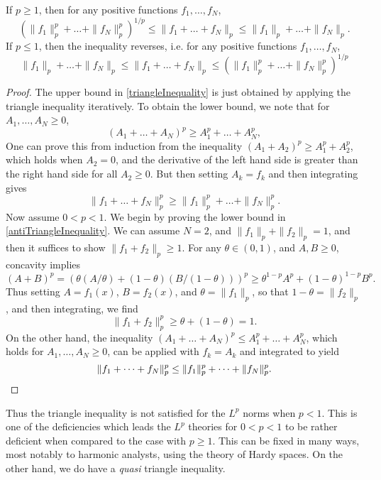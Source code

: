 \begin{theorem}
    If $p \geq 1$, then for any positive functions $f_1, \dots, f_N$,
    \begin{equation} \label{triangleInequality} ( \| f_1 \|_p^p + \dots + \| f_N \|_p^p )^{1/p} \leq \| f_1 + \dots + f_N \|_p \leq \| f_1 \|_p + \dots + \| f_N \|_p. \end{equation}
    If $p \leq 1$, then the inequality reverses, i.e. for any positive functions $f_1, \dots, f_N$,
    \begin{equation} \label{antiTriangleInequality} \| f_1 \|_p + \dots + \| f_N \|_p \leq \| f_1 + \dots + f_N \|_p \leq (\| f_1 \|_p^p + \dots + \| f_N \|_p^p)^{1/p} \end{equation}
\end{theorem}
\begin{proof}
    The upper bound in \ref{triangleInequality} is just obtained by applying the triangle inequality iteratively. To obtain the lower bound, we note that for $A_1, \dots, A_N \geq 0$,
    \[ (A_1 + \dots + A_N)^p \geq A_1^p + \dots + A_N^p, \]
    One can prove this from induction from the inequality $(A_1 + A_2)^p \geq A_1^p + A_2^p$, which holds when $A_2 = 0$, and the derivative of the left hand side is greater than the right hand side for all $A_2 \geq 0$. But then setting $A_k = f_k$ and then integrating gives
    \[ \| f_1 + \dots + f_N \|_p^p \geq \| f_1 \|_p^p + \dots + \| f_N \|_p^p. \]
    Now assume $0 < p < 1$. We begin by proving the lower bound in \ref{antiTriangleInequality}. We can assume $N = 2$, and $\| f_1 \|_p + \| f_2 \|_p = 1$, and then it suffices to show $\| f_1 + f_2 \|_p \geq 1$. For any $\theta \in (0,1)$, and $A,B \geq 0$, concavity implies
    \[ (A + B)^p = (\theta (A/\theta) + (1 - \theta) (B/(1-\theta)))^p \geq \theta^{1-p} A^p + (1 - \theta)^{1-p} B^p. \]
    Thus setting $A = f_1(x)$, $B = f_2(x)$, and $\theta = \| f_1 \|_p$, so that $1 - \theta = \| f_2 \|_p$, and then integrating, we find
    \[ \| f_1 + f_2 \|_p^p \geq \theta + (1 - \theta) = 1. \]
    On the other hand, the inequality $(A_1 + \dots + A_N)^p \leq A_1^p + \dots + A_N^p$, which holds for $A_1, \dots, A_N \geq 0$, can be applied with $f_k = A_k$ and integrated to yield
    \[ \| f_1 + \dots + f_N \|_p^p \leq \| f_1 \|_p^p + \dots + \| f_N \|_p^p. \qedhere \]
\end{proof}

Thus the triangle inequality is not satisfied for the $L^p$ norms when $p < 1$. This is one of the deficiencies which leads the $L^p$ theories for $0 < p < 1$ to be rather deficient when compared to the case with $p \geq 1$. This can be fixed in many ways, most notably to harmonic analysts, using the theory of Hardy spaces. On the other hand, we do have a \emph{quasi} triangle inequality.

